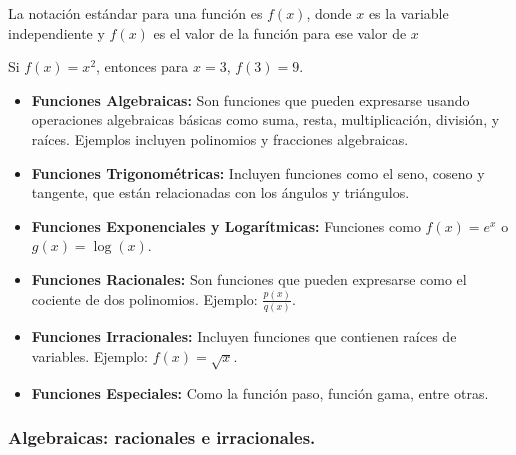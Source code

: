 \begin{notation}
    La notación estándar para una función es \( f(x) \), donde \( x \) es la variable independiente y \( f(x) \) es el valor de la función para ese valor de \( x \)
\end{notation}
\begin{example}
    Si \( f(x) = x^2 \), entonces para \( x = 3 \), \( f(3) = 9 \).
\end{example}

\begin{itemize}
    \item \textbf{Funciones Algebraicas:} Son funciones que pueden expresarse usando operaciones algebraicas básicas como suma, resta, multiplicación, división, y raíces. Ejemplos incluyen polinomios y fracciones algebraicas.
    \item \textbf{Funciones Trigonométricas:} Incluyen funciones como el seno, coseno y tangente, que están relacionadas con los ángulos y triángulos.
    \item \textbf{Funciones Exponenciales y Logarítmicas:} Funciones como \( f(x) = e^x \) o \( g(x) = \log(x) \).
    \item \textbf{Funciones Racionales:} Son funciones que pueden expresarse como el cociente de dos polinomios. Ejemplo: \( \frac{p(x)}{q(x)} \).
    \item \textbf{Funciones Irracionales:} Incluyen funciones que contienen raíces de variables. Ejemplo: \( f(x) = \sqrt{x} \).
    \item \textbf{Funciones Especiales:} Como la función paso, función gama, entre otras.
\end{itemize}

\subsubsection{Algebraicas: racionales e irracionales.}



